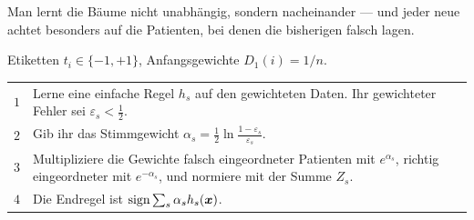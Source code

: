 \begin{merksatz}
Man lernt die Bäume nicht unabhängig, sondern nacheinander --- und jeder neue achtet besonders auf die Patienten, bei denen die bisherigen falsch lagen.

Etiketten $t_i \in \{-1,+1\}$, Anfangsgewichte $D_1(i) = 1/n$.

\begin{center}
{\small
\renewcommand{\arraystretch}{1.5}
\begin{tabular}{@{}P{1.0cm}P{7.4cm}@{}}
\toprule
$1$ & Lerne eine einfache Regel $h_s$ auf den gewichteten Daten. Ihr gewichteter Fehler sei $\varepsilon_s < \tfrac12$.\\
$2$ & Gib ihr das Stimmgewicht $\alpha_s = \tfrac12\ln\frac{1-\varepsilon_s}{\varepsilon_s}$.\\
$3$ & Multipliziere die Gewichte falsch eingeordneter Patienten mit $e^{\alpha_s}$, richtig eingeordneter mit $e^{-\alpha_s}$, und normiere mit der Summe $Z_s$.\\
$4$ & Die Endregel ist $\operatorname{sign}\sum_s \alpha_s h_s(\boldsymbol{x})$.\\
\bottomrule
\end{tabular}}
\end{center}
\end{merksatz}

